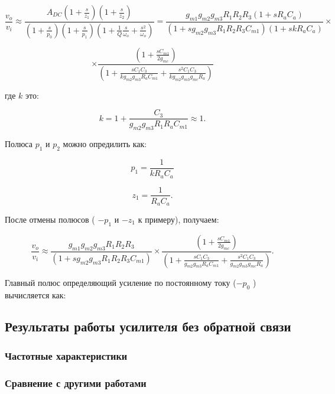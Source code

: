 \documentclass[a4paper,12pt]{article} %
\begin{document}
$$ \frac{v_{o}}{v_{i}}\approx\frac{A_{DC}\left(1+\frac{s}{z_{1}}\right)\left(1+\frac{s}{z_{2}}\right)}{\left(1+\frac{s}{p_{0}}\right)\left(1+\frac{s}{p_{1}}\right)\left(1+\frac{1}{Q}\frac{s}{\omega_{o}}+\frac{s^{2}}{\omega_{o}}\right)}=\frac{g_{m1}g_{m2}g_{m3}R_{1}R_{2}R_{3}\left(1+sR_{a}C_{a}\right)}{\left(1+sg_{m2}g_{m3}R_{1}R_{2}R_{3}C_{m1}\right)\left(1+skR_{a}C_{a}\right)}\times $$ 

$$ \times  \frac{\left(1+\frac{sC_{m1}}{2g_{mc}}\right)}{\left(1 + \frac{sC_{1}C_{3}}{kg_{m2}g_{m3}R_{a}C_{m1}} + \frac{s^{2}C_{1}C_{3}}{kg_{m2}g_{m3}g_{mc}R_{a}}\right)}\; $$


где $k$ это:

$$k = 1 + \frac{C_{3}}{g_{m2}g_{m3}R_{1}R_{a}C_{m1}}\approx1.\;$$

Полюса $p_1$  и $p_2$ можно опредилить как:

$$p_{1} = \frac{1}{kR_{a}C_{a}}\;$$

$$z_{1} = \frac{1}{R_{a}C_{a}}.\;$$

После отмены полюсов ( $ -p_1 $ и  $  -z_1 $ к примеру), получаем:

$$\frac{v_{o}}{v_{i}}\approx\frac{g_{m1}g_{m2}g_{m3}R_{1}R_{2}R_{3}}{\left(1+sg_{m2}g_{m3}R_{1}R_{2}R_{3}C_{m1}\right)}\times\frac{\left(1+\frac{sC_{m1}}{2g_{mc}}\right)}{\left(1 + \frac{sC_{1}C_{3}}{g_{m2}g_{m3}R_{a}C_{m1}} + \frac{s^{2}C_{1}C_{3}}{g_{m2}g_{m3}g_{mc}R_{a}}\right)}.\;$$

Главный полюс определяющий усиление по постоянному току ($ -p_0 $ ) вычисляется как:

\subsection{Результаты работы усилителя без обратной связи}


\subsubsection{Частотные характеристики}



\subsubsection{Сравнение с другими работами}
\end{document}
